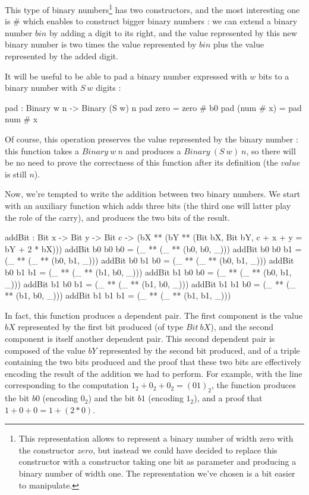 This type of binary numbers\footnote{This representation allows to represent a binary number of width zero with the constructor $zero$, but instead we could have decided to replace this constructor with a constructor taking one bit as parameter and producing a binary number of width one. The representation we've chosen is a bit easier to manipulate.}  has two constructors, and the most interesting one is $\#$ which enables to construct bigger binary numbers : we can extend a binary number $bin$ by adding a digit to its right, and the value represented by this new binary number is two times the value represented by $bin$ plus the value represented by the added digit.

It will be useful to be able to pad a binary number expressed with $w$ bits to a binary number with $S\ w$ digits : 
\begin{code}[caption=Padding, captionpos=b, label=lst1:haskell2]
pad : Binary w n -> Binary (S w) n
pad zero = zero # b0
pad (num # x) = pad num # x
\end{code}
Of course, this operation preserves the value represented by the binary number : this function takes a $Binary\ w\ n$ and produces a $Binary\ (S\ w)\ n$, so there will be no need to prove the correctness of this function after its definition (the $value$ is still $n$).

Now, we're tempted to write the addition between two binary numbers.
We start with an auxiliary function which adds three bits (the third one will latter play the role of the carry), and produces the two bits of the result.

\begin{code}[caption=Addition of three bits, captionpos=b, label=lst1:haskell2]
addBit : Bit x -> Bit y -> Bit c ->
          (bX ** (bY ** 
              (Bit bX, Bit bY, 
                  c + x + y = bY + 2 * bX)))
addBit b0 b0 b0 = (_ ** (_ ** (b0, b0, _)))
addBit b0 b0 b1 = (_ ** (_ ** (b0, b1, _)))
addBit b0 b1 b0 = (_ ** (_ ** (b0, b1, _)))
addBit b0 b1 b1 = (_ ** (_ ** (b1, b0, _)))
addBit b1 b0 b0 = (_ ** (_ ** (b0, b1, _)))
addBit b1 b0 b1 = (_ ** (_ ** (b1, b0, _)))
addBit b1 b1 b0 = (_ ** (_ ** (b1, b0, _)))
addBit b1 b1 b1 = (_ ** (_ ** (b1, b1, _)))
\end{code}

In fact, this function produces a dependent pair. The first component is the value $bX$ represented by the first bit produced (of type $Bit\ bX$), and the second component is itself another dependent pair. This second dependent pair is composed of the value $bY$ represented by the second bit produced, and of a triple containing the two bits produced and the proof that these two bits are effectively encoding the result of the addition we had to perform.
For example, with the line corresponding to the computation $1_2 + 0_2 + 0_2 = (01)_2$, the function produces the bit $b0$ (encoding $0_2$) and the bit $b1$ (encoding $1_2$), and a proof that $1 + 0 + 0 = 1 + (2*0)$.

